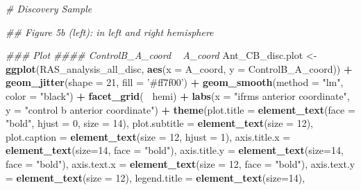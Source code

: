 \documentclass[
]{article}
\newenvironment{Shaded}{\begin{snugshade}}{\end{snugshade}}
\newcommand{\CommentTok}[1]{\textcolor[rgb]{0.56,0.35,0.01}{\textit{#1}}}
\newcommand{\DataTypeTok}[1]{\textcolor[rgb]{0.13,0.29,0.53}{#1}}
\newcommand{\DecValTok}[1]{\textcolor[rgb]{0.00,0.00,0.81}{#1}}
\newcommand{\KeywordTok}[1]{\textcolor[rgb]{0.13,0.29,0.53}{\textbf{#1}}}
\newcommand{\NormalTok}[1]{#1}
\newcommand{\OperatorTok}[1]{\textcolor[rgb]{0.81,0.36,0.00}{\textbf{#1}}}
\newcommand{\StringTok}[1]{\textcolor[rgb]{0.31,0.60,0.02}{#1}}
\begin{document}
\begin{Shaded}
\begin{Highlighting}[]
\CommentTok{# Discovery Sample}

\CommentTok{## Figure 5b (left): in left and right hemisphere }

\CommentTok{### Plot }
\CommentTok{#### ControlB_A_coord ~ A_coord }
\NormalTok{Ant_CB_disc.plot <-}\StringTok{ }\KeywordTok{ggplot}\NormalTok{(RAS_analysis_all_disc, }\KeywordTok{aes}\NormalTok{(}\DataTypeTok{x =}\NormalTok{ A_coord, }\DataTypeTok{y =}\NormalTok{ ControlB_A_coord)) }\OperatorTok{+}
\StringTok{   }\KeywordTok{geom_jitter}\NormalTok{(}\DataTypeTok{shape =} \DecValTok{21}\NormalTok{, }\DataTypeTok{fill =} \StringTok{'#ff7f00'}\NormalTok{) }\OperatorTok{+}\StringTok{ }
\StringTok{   }\KeywordTok{geom_smooth}\NormalTok{(}\DataTypeTok{method =} \StringTok{"lm"}\NormalTok{, }\DataTypeTok{color =} \StringTok{"black"}\NormalTok{) }\OperatorTok{+}\StringTok{ }\KeywordTok{facet_grid}\NormalTok{(}\OperatorTok{~}\StringTok{ }\NormalTok{hemi) }\OperatorTok{+}
\StringTok{   }\KeywordTok{labs}\NormalTok{(}\DataTypeTok{x =} \StringTok{"ifrms anterior coordinate"}\NormalTok{,}
        \DataTypeTok{y =} \StringTok{"control b anterior coordinate"}\NormalTok{) }\OperatorTok{+}\StringTok{ }
\StringTok{   }\KeywordTok{theme}\NormalTok{(}\DataTypeTok{plot.title =} \KeywordTok{element_text}\NormalTok{(}\DataTypeTok{face =} \StringTok{"bold"}\NormalTok{, }\DataTypeTok{hjust =} \DecValTok{0}\NormalTok{, }\DataTypeTok{size =} \DecValTok{14}\NormalTok{), }
         \DataTypeTok{plot.subtitle =} \KeywordTok{element_text}\NormalTok{(}\DataTypeTok{size =} \DecValTok{12}\NormalTok{),}
         \DataTypeTok{plot.caption =} \KeywordTok{element_text}\NormalTok{(}\DataTypeTok{size =} \DecValTok{12}\NormalTok{, }\DataTypeTok{hjust =} \DecValTok{1}\NormalTok{),}
         \DataTypeTok{axis.title.x =} \KeywordTok{element_text}\NormalTok{(}\DataTypeTok{size=}\DecValTok{14}\NormalTok{, }\DataTypeTok{face =} \StringTok{"bold"}\NormalTok{),}
         \DataTypeTok{axis.title.y =} \KeywordTok{element_text}\NormalTok{(}\DataTypeTok{size=}\DecValTok{14}\NormalTok{, }\DataTypeTok{face =} \StringTok{"bold"}\NormalTok{),}
         \DataTypeTok{axis.text.x =} \KeywordTok{element_text}\NormalTok{(}\DataTypeTok{size =} \DecValTok{12}\NormalTok{, }\DataTypeTok{face =} \StringTok{"bold"}\NormalTok{),}
         \DataTypeTok{axis.text.y =} \KeywordTok{element_text}\NormalTok{(}\DataTypeTok{size =} \DecValTok{12}\NormalTok{),}
         \DataTypeTok{legend.title =} \KeywordTok{element_text}\NormalTok{(}\DataTypeTok{size=}\DecValTok{14}\NormalTok{), }

\end{Highlighting}
\end{Shaded}
\end{document}
